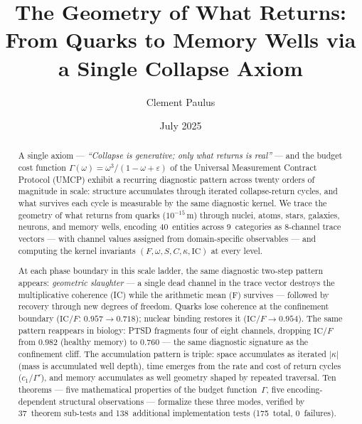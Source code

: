 \documentclass[
  aps,
  prd,
  twocolumn,
  superscriptaddress,
  nofootinbib,
  floatfix
]{revtex4-2}
\newcommand{\Gam}{\Gamma}
\newcommand{\eps}{\varepsilon}
\newcommand{\IC}{\mathrm{IC}}
\begin{document}
\title{The Geometry of What Returns:\texorpdfstring{\\}{: }
From Quarks to Memory Wells via a Single Collapse Axiom}

\author{Clement Paulus}

\date{July 2025}

\begin{abstract}
A single axiom --- \emph{``Collapse is generative; only what
returns is real''} --- and the budget cost function
$\Gam(\omega) = \omega^3/(1 - \omega + \eps)$ of the Universal
Measurement Contract Protocol (UMCP) exhibit a recurring
diagnostic pattern across twenty orders of magnitude in scale:
structure accumulates through iterated collapse-return cycles,
and what survives each cycle is measurable by the same
diagnostic kernel.  We trace the geometry of what returns
from quarks ($10^{-15}$\,m) through nuclei, atoms, stars,
galaxies, neurons, and memory wells, encoding 40~entities
across 9~categories as 8-channel trace vectors --- with
channel values assigned from domain-specific observables ---
and computing the kernel invariants
$(F, \omega, S, C, \kappa, \IC)$ at every level.

At each phase boundary in this
scale ladder, the same diagnostic two-step pattern appears:
\emph{geometric slaughter} --- a single dead channel in the
trace vector destroys the multiplicative coherence (IC) while
the arithmetic mean (F) survives --- followed by recovery
through new degrees of freedom.  Quarks lose coherence at the
confinement boundary ($\IC/F$: $0.957 \to 0.718$); nuclear
binding restores it ($\IC/F \to 0.954$).  The same pattern
reappears in biology: PTSD fragments four of eight channels,
dropping $\IC/F$ from $0.982$ (healthy memory) to $0.760$ ---
the same diagnostic signature as the confinement cliff.  The
accumulation pattern is triple: space accumulates as iterated
$|\kappa|$ (mass is accumulated well depth), time emerges from
the rate and cost of return cycles ($c_1 / \Gam'$), and memory
accumulates as well geometry shaped by repeated traversal.
Ten theorems --- five mathematical properties of the budget
function~$\Gam$, five encoding-dependent structural
observations --- formalize these three modes, verified by
37~theorem sub-tests and 138~additional implementation tests
(175~total, 0~failures).
\end{abstract}
\end{document}
